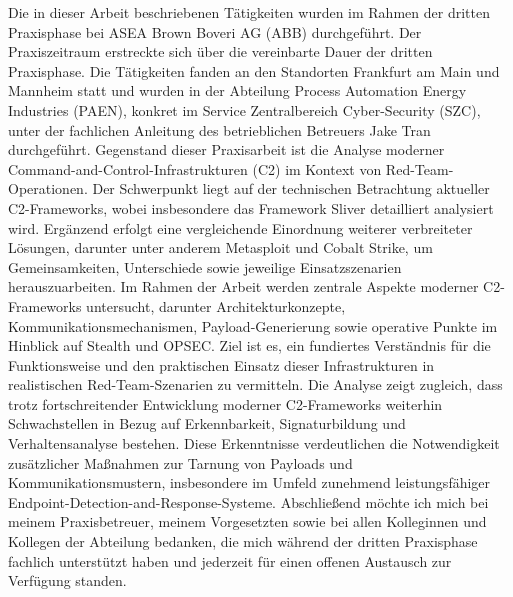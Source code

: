  Die in dieser Arbeit beschriebenen Tätigkeiten wurden im Rahmen der dritten Praxisphase bei ASEA Brown Boveri AG (ABB) durchgeführt. Der Praxiszeitraum erstreckte sich über die vereinbarte Dauer der dritten Praxisphase. 
 Die Tätigkeiten fanden an den Standorten Frankfurt am Main und Mannheim statt und wurden in der Abteilung Process Automation Energy Industries (PAEN), konkret im Service Zentralbereich Cyber-Security (SZC), unter der fachlichen Anleitung des betrieblichen Betreuers Jake Tran durchgeführt.
\newline
\newline
Gegenstand dieser Praxisarbeit ist die Analyse moderner Command-and-Control-Infrastrukturen (C2) im Kontext von Red-Team-Operationen. Der Schwerpunkt liegt auf der technischen Betrachtung aktueller C2-Frameworks, wobei insbesondere das Framework Sliver detailliert analysiert wird. 
Ergänzend erfolgt eine vergleichende Einordnung weiterer verbreiteter Lösungen, darunter unter anderem Metasploit und Cobalt Strike, um Gemeinsamkeiten, Unterschiede sowie jeweilige Einsatzszenarien herauszuarbeiten.
\newline
\newline
Im Rahmen der Arbeit werden zentrale Aspekte moderner C2-Frameworks untersucht, darunter Architekturkonzepte, Kommunikationsmechanismen, Payload-Generierung sowie operative Punkte im Hinblick auf Stealth und OPSEC. 
Ziel ist es, ein fundiertes Verständnis für die Funktionsweise und den praktischen Einsatz dieser Infrastrukturen in realistischen Red-Team-Szenarien zu vermitteln.
\newline
\newline
Die Analyse zeigt zugleich, dass trotz fortschreitender Entwicklung moderner C2-Frameworks weiterhin Schwachstellen in Bezug auf Erkennbarkeit, Signaturbildung und Verhaltensanalyse bestehen. 
Diese Erkenntnisse verdeutlichen die Notwendigkeit zusätzlicher Maßnahmen zur Tarnung von Payloads und Kommunikationsmustern, insbesondere im Umfeld zunehmend leistungsfähiger Endpoint-Detection-and-Response-Systeme.
\newline
\newline
Abschließend möchte ich mich bei meinem Praxisbetreuer, meinem Vorgesetzten sowie bei allen Kolleginnen und Kollegen der Abteilung bedanken, die mich während der dritten Praxisphase fachlich unterstützt haben und jederzeit für einen offenen Austausch zur Verfügung standen.